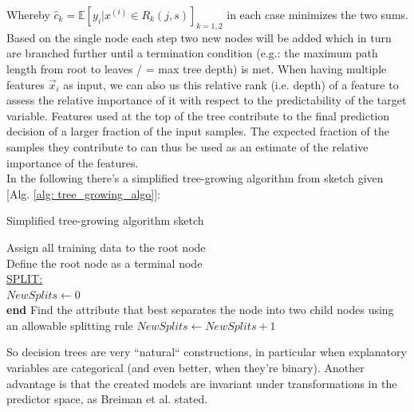 \documentclass[12pt, a4paper]{article}
\begin{document}
Whereby $\hat{c}_k = \mathbb{E}[y_i | x^{(i)} \in R_k(j,s)]_{k = 1,2}$ in each case minimizes the two sums. Based on the single node each step two new nodes will be added which in turn are branched further until a termination condition (e.g.: the maximum path length from root to leaves / = max tree depth) is met. 
When having multiple features $\vec{x}_i$ as input, we can also us this relative rank (i.e. depth) of a feature to assess the relative importance of it with respect to the predictability of the target variable. Features used at the top of the tree contribute to the final prediction decision of a larger fraction of the input samples. The expected fraction of the samples they contribute to can thus be used as an estimate of the relative importance of the features. \\
In the following there's a simplified tree-growing algorithm from sketch given [Alg. \ref{alg: tree_growing_algo}]:
\begin{algorithm}
\caption{Simplified tree-growing algorithm sketch}\label{alg: tree_growing_algo}
    Assign all training data to the root node \\
    Define the root node as a terminal node \\
    \underline{SPLIT:} \\
    $NewSplits \gets 0$ \\
    {
        {\textbf{end}}
        {Find the attribute that best separates the node into two child nodes using an allowable splitting rule}
        $NewSplits \gets NewSplits + 1$\;
    }
\end{algorithm}
\newpage
So decision trees are very ``natural`` constructions, in particular when explanatory variables are categorical (and even better, when they're binary). Another advantage is that the created models are invariant under transformations in the predictor space, as Breiman et al. \cite{Breiman1984} stated. 
\end{document}
